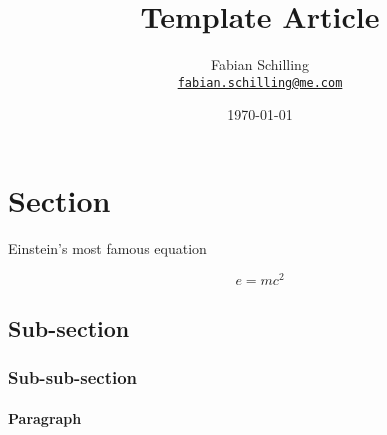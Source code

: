 \documentclass[11pt, a4paper, oneside]{article}
\title{Template Article}
\author{Fabian Schilling\\
\href{mailto:fabian.schilling@me.com}{\texttt{fabian.schilling@me.com}}}
\date{\today}
\begin{document}


\maketitle %

\begin{abstract}
  \lipsum[4]
\end{abstract}

\section{Section} \label{sec:section}

\lipsum[4]

Einstein's most famous equation \cite{einstein}

\begin{equation} \label{eq:equation}
  e = mc^2
\end{equation}

\subsection{Sub-section} \label{sec:subsection}

\lipsum[4]

\subsubsection{Sub-sub-section} \label{sec:subsubsection}

\lipsum[4]

\paragraph{Paragraph} \label{par:paragraph}

\lipsum[4]

\begin{comment}
  This is just a comment. It will not be visible in the PDF!
\end{comment}



\end{document}
